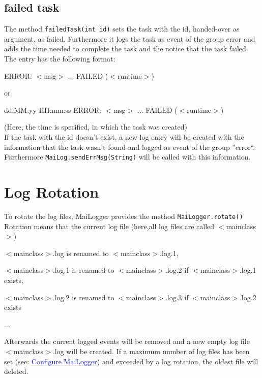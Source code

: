 \documentclass{article}
\newcommand{\refh}[2]{\hyperref[#1] {\textcolor{blue}{#2}}}
\newcommand{\tab}[1][1]{\hspace*{#1cm}}
\begin{document}
    \subsection{failed task}
    \label{task_failedTask}
    The method \lstinline|failedTask(int id)| sets the task with the id, handed-over as argument, as failed.
    Furthermore it logs the task as event of the group error and adds the time needed to complete the task and the notice that the task failed.
    The entry has the following format:
    \begin{description}
        \item ERROR: $<$msg$>$ ... FAILED ($<$runtime$>$)
        \item or
        \item dd.MM.yy HH:mm:ss ERROR: $<$msg$>$ ... FAILED ($<$runtime$>$)
    \end{description}
    (Here, the time is specified, in which the task was created) \\
    If the task with the id doesn't exist, a new log entry will be created with the information that the task wasn't found and logged as event of the group ''error``.
    Furthermore \lstinline|MaiLog.sendErrMsg(String)| will be called with this information.

\section{Log Rotation}
    To rotate the log files, MaiLogger provides the method \lstinline|MaiLogger.rotate()|
    Rotation means that the current log file (here,all log files are called $<$mainclass$>$)
    \begin{description}
        \item $<$mainclass$>$.log is renamed to $<$mainclass$>$.log.1,
        \item $<$mainclass$>$.log.1 is renamed to $<$mainclass$>$.log.2 if $<$mainclass$>$.log.1 exists,
        \item $<$mainclass$>$.log.2 is renamed to $<$mainclass$>$.log.3 if $<$mainclass$>$.log.2 exists
        \item \tab[5]...
    \end{description}
    Afterwards the current logged events will be removed and a new empty log file $<$mainclass$>$.log will be created.
    If a maximum number of log files has been set (see: \refh{setup_mailogger.setup}{Configure MaiLogger}) and exceeded by a log rotation, the oldest file will deleted.
\end{document}
